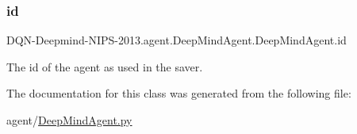 \subsubsection{\texorpdfstring{id}{id}}
{\footnotesize\ttfamily D\+QN-\/Deepmind-\/N\+I\+PS-\/2013.agent.\+Deep\+Mind\+Agent.\+Deep\+Mind\+Agent.\+id}



The id of the agent as used in the saver. 



The documentation for this class was generated from the following file\+:\begin{DoxyCompactItemize}
\item 
agent/\hyperlink{DeepMindAgent_8py}{Deep\+Mind\+Agent.\+py}\end{DoxyCompactItemize}
